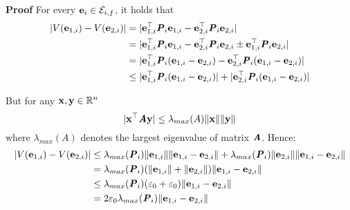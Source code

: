 \begin{gg_box}
\textbf{Proof} For every $\bm{\mathbf{e}}_i \in \mathcal{E}_{i,f}$, it holds that
\begin{align}
  |V(\bm{\mathbf{e}}_{1,i}) - V(\bm{\mathbf{e}}_{2,i})| &= |\bm{\mathbf{e}}_{1,i}^{\top} \bm{\mathit{P}}_i \bm{\mathbf{e}}_{1,i} - \bm{\mathbf{e}}_{2,i}^{\top} \bm{\mathit{P}}_i \bm{\mathbf{e}}_{2,i}| \\
    &= |\bm{\mathbf{e}}_{1,i}^{\top} \bm{\mathit{P}}_i \bm{\mathbf{e}}_{1,i} - \bm{\mathbf{e}}_{2,i}^{\top} \bm{\mathit{P}}_i \bm{\mathbf{e}}_{2,i} \pm \bm{\mathbf{e}}_{1,i}^{\top} \bm{\mathit{P}}_i \bm{\mathbf{e}}_{2,i}| \\
    &= |\bm{\mathbf{e}}_{1,i}^{\top} \bm{\mathit{P}}_i (\bm{\mathbf{e}}_{1,i}-\bm{\mathbf{e}}_{2,i}) - \bm{\mathbf{e}}_{2,i}^{\top} \bm{\mathit{P}}_i (\bm{\mathbf{e}}_{1,i}-\bm{\mathbf{e}}_{2,i})| \\
    &\leq |\bm{\mathbf{e}}_{1,i}^{\top} \bm{\mathit{P}}_i (\bm{\mathbf{e}}_{1,i}-\bm{\mathbf{e}}_{2,i})| + |\bm{\mathbf{e}}_{2,i}^{\top} \bm{\mathit{P}}_i (\bm{\mathbf{e}}_{1,i}-\bm{\mathbf{e}}_{2,i})|
\end{align}

But for any $\bm{\mathbf{x}}, \bm{\mathbf{y}} \in \mathbb{R}^n$
$$|\bm{\mathbf{x}}^{\top} \bm{\mathit{A}} \bm{\mathbf{y}}| \leq \lambda_{max}(A) \|\bm{\mathbf{x}}\| \|\bm{\mathbf{y}}\|$$
where $\lambda_{max}(A)$ denotes the largest eigenvalue of matrix $\bm{\mathit{A}}$.
Hence:
\begin{align}
  |V(\bm{\mathbf{e}}_{1,i}) - V(\bm{\mathbf{e}}_{2,i})| &\leq
  \lambda_{max}(\bm{\mathit{P}}_i) \|\bm{\mathbf{e}}_{1,i}\| \|\bm{\mathbf{e}}_{1,i} - \bm{\mathbf{e}}_{2,i}\| +
  \lambda_{max}(\bm{\mathit{P}}_i) \|\bm{\mathbf{e}}_{2,i}\| \|\bm{\mathbf{e}}_{1,i} - \bm{\mathbf{e}}_{2,i}\| \\
  &= \lambda_{max}(\bm{\mathit{P}}_i) (\|\bm{\mathbf{e}}_{1,i}\| + \|\bm{\mathbf{e}}_{2,i}\|)\|\bm{\mathbf{e}}_{1,i} - \bm{\mathbf{e}}_{2,i}\| \\
  & \leq \lambda_{max}(\bm{\mathit{P}}_i) (\varepsilon_0 + \varepsilon_0)\|\bm{\mathbf{e}}_{1,i} - \bm{\mathbf{e}}_{2,i}\| \\
  &= 2 \varepsilon_0 \lambda_{max}(\bm{\mathit{P}}_i) \|\bm{\mathbf{e}}_{1,i} - \bm{\mathbf{e}}_{2,i}\|
\end{align}
\qedsymbol
\end{gg_box}


